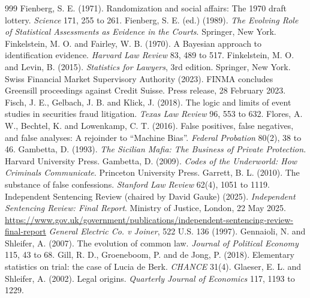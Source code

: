 \begin{thebibliography}{999}
 Fienberg, S. E. (1971). Randomization and social affairs: The 1970 draft lottery. \emph{Science} 171, 255 to 261.
 Fienberg, S. E. (ed.) (1989). \emph{The Evolving Role of Statistical Assessments as Evidence in the Courts}. Springer, New York.
 Finkelstein, M. O. and Fairley, W. B. (1970). A Bayesian approach to identification evidence. \emph{Harvard Law Review} 83, 489 to 517.
 Finkelstein, M. O. and Levin, B. (2015). \emph{Statistics for Lawyers}, 3rd edition. Springer, New York.
 Swiss Financial Market Supervisory Authority (2023). FINMA concludes Greensill proceedings against Credit Suisse. Press release, 28 February 2023.
 Fisch, J. E., Gelbach, J. B. and Klick, J. (2018). The logic and limits of event studies in securities fraud litigation. \emph{Texas Law Review} 96, 553 to 632.
 Flores, A. W., Bechtel, K. and Lowenkamp, C. T. (2016). False positives, false negatives, and false analyses: A rejoinder to ``Machine Bias''. \emph{Federal Probation} 80(2), 38 to 46.
 Gambetta, D. (1993). \emph{The Sicilian Mafia: The Business of Private Protection}. Harvard University Press.
 Gambetta, D. (2009). \emph{Codes of the Underworld: How Criminals Communicate}. Princeton University Press.
 Garrett, B. L. (2010). The substance of false confessions. \emph{Stanford Law Review} 62(4), 1051 to 1119.
 Independent Sentencing Review (chaired by David Gauke) (2025). \emph{Independent Sentencing Review: Final Report}. Ministry of Justice, London, 22 May 2025. \url{https://www.gov.uk/government/publications/independent-sentencing-review-final-report}
 \emph{General Electric Co. v Joiner}, 522 U.S. 136 (1997).
 Gennaioli, N. and Shleifer, A. (2007). The evolution of common law. \emph{Journal of Political Economy} 115, 43 to 68.
 Gill, R. D., Groeneboom, P. and de Jong, P. (2018). Elementary statistics on trial: the case of Lucia de Berk. \emph{CHANCE} 31(4).
 Glaeser, E. L. and Shleifer, A. (2002). Legal origins. \emph{Quarterly Journal of Economics} 117, 1193 to 1229.

\end{thebibliography}

